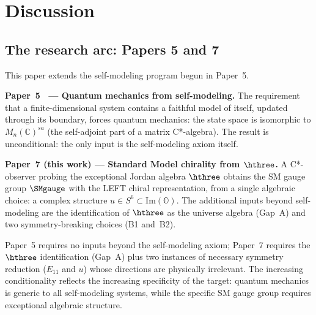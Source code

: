 
\section{Discussion}\label{sec:discussion}

\subsection{The research arc: Papers 5 and 7}\label{sec:arc}

This paper extends the self-modeling program begun in Paper~5.

\medskip
\noindent\textbf{Paper~5~\cite{Paper5} --- Quantum mechanics from
self-modeling.}
The requirement that a finite-dimensional system contains a faithful
model of itself, updated through its boundary, forces quantum
mechanics: the state space is isomorphic to $M_n(\mathbb{C})^{sa}$
(the self-adjoint part of a matrix C*-algebra).  The result is
unconditional: the only input is the self-modeling axiom itself.

\medskip
\noindent\textbf{Paper~7 (this work) --- Standard Model chirality
from $\hthree$.}
A C*-observer probing the exceptional Jordan algebra $\hthree$
obtains the SM gauge group $\SMgauge$ with the LEFT chiral
representation, from a single algebraic choice: a complex structure
$u\in S^6\subset\mathrm{Im}(\mathbb{O})$.  The additional inputs
beyond self-modeling are the identification of $\hthree$ as the
universe algebra (Gap~A) and two symmetry-breaking choices (B1
and~B2).

\medskip
\noindent
Paper~5 requires no inputs beyond the self-modeling axiom;
Paper~7 requires the $\hthree$ identification (Gap~A) plus two
instances of necessary symmetry reduction ($E_{11}$ and $u$)
whose directions are physically irrelevant.  The increasing
conditionality reflects the increasing specificity of the target:
quantum mechanics is generic to all self-modeling systems, while the
specific SM gauge group requires exceptional algebraic structure.

